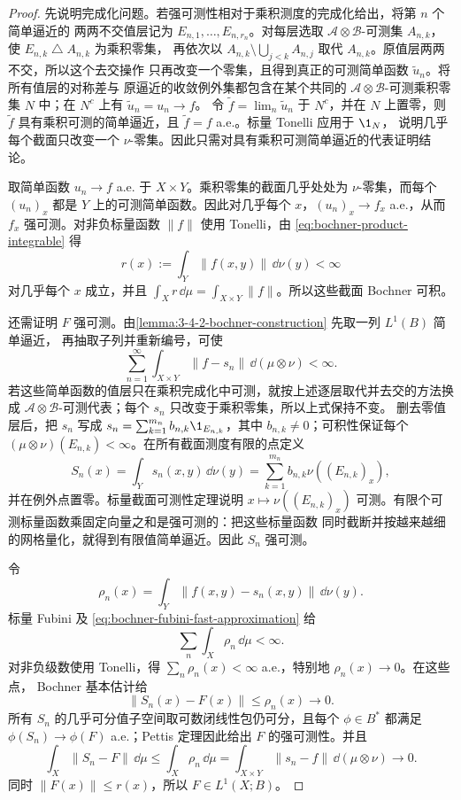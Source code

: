 \begin{proof}
先说明完成化问题。若强可测性相对于乘积测度的完成化给出，将第 $n$ 个简单逼近的
两两不交值层记为 $E_{n,1},\ldots,E_{n,r_n}$。对每层选取
$\mathcal A\otimes\mathcal B$-可测集 $A_{n,k}$，使 $E_{n,k}\mathbin\triangle A_{n,k}$ 为乘积零集，
再依次以 $A_{n,k}\setminus\bigcup_{j<k}A_{n,j}$ 取代 $A_{n,k}$。原值层两两不交，所以这个去交操作
只再改变一个零集，且得到真正的可测简单函数 $\widetilde u_n$。将所有值层的对称差与
原逼近的收敛例外集都包含在某个共同的
$\mathcal A\otimes\mathcal B$-可测乘积零集 $N$ 中；在 $N^c$ 上有 $\widetilde u_n=u_n\to f$。
令 $\widetilde f=\lim_n\widetilde u_n$ 于 $N^c$，并在 $N$ 上置零，则 $\widetilde f$ 具有乘积可测的简单逼近，且
$\widetilde f=f$ a.e.。标量 Tonelli 应用于 $\1_N$，
说明几乎每个截面只改变一个 $\nu$-零集。因此只需对具有乘积可测简单逼近的代表证明结论。

取简单函数 $u_n\to f$ a.e. 于 $X\times Y$。乘积零集的截面几乎处处为 $\nu$-零集，而每个
$(u_n)_x$ 都是 $Y$ 上的可测简单函数。因此对几乎每个 $x$，$(u_n)_x\to f_x$ a.e.，从而
$f_x$ 强可测。对非负标量函数 $\|f\|$ 使用 Tonelli，由
\eqref{eq:bochner-product-integrable} 得
\[
 r(x):=\int_Y\|f(x,y)\|\,\dd\nu(y)<\infty
\]
对几乎每个 $x$ 成立，并且 $\int_Xr\,\dd\mu=\int_{X\times Y}\|f\|$。所以这些截面
Bochner 可积。

还需证明 $F$ 强可测。由\cref{lemma:3-4-2-bochner-construction} 先取一列 $L^1(B)$ 简单逼近，
再抽取子列并重新编号，可使
\[
 \sum_{n=1}^{\infty}\int_{X\times Y}\|f-s_n\|\,\dd(\mu\otimes\nu)<\infty.
 \tag{3.4.18}\label{eq:bochner-fubini-fast-approximation}
\]
若这些简单函数的值层只在乘积完成化中可测，就按上述逐层取代并去交的方法换成
$\mathcal A\otimes\mathcal B$-可测代表；每个 $s_n$ 只改变于乘积零集，所以上式保持不变。
删去零值层后，把 $s_n$ 写成
$s_n=\sum_{k=1}^{m_n}b_{n,k}\1_{E_{n,k}}$，其中 $b_{n,k}\ne0$；可积性保证每个
$(\mu\otimes\nu)(E_{n,k})<\infty$。在所有截面测度有限的点定义
\[
 S_n(x)=\int_Ys_n(x,y)\,\dd\nu(y)
       =\sum_{k=1}^{m_n}b_{n,k}\nu((E_{n,k})_x),
 \tag{3.4.19}\label{eq:simple-section-integral}
\]
并在例外点置零。标量截面可测性定理说明
$x\mapsto\nu((E_{n,k})_x)$ 可测。有限个可测标量函数乘固定向量之和是强可测的：把这些标量函数
同时截断并按越来越细的网格量化，就得到有限值简单逼近。因此 $S_n$ 强可测。

令
\[
 \rho_n(x)=\int_Y\|f(x,y)-s_n(x,y)\|\,\dd\nu(y).
\]
标量 Fubini 及 \eqref{eq:bochner-fubini-fast-approximation} 给
\[
 \sum_n\int_X\rho_n\,\dd\mu<\infty.
\]
对非负级数使用 Tonelli，得 $\sum_n\rho_n(x)<\infty$ a.e.，特别地 $\rho_n(x)\to0$。在这些点，
Bochner 基本估计给
\[
 \|S_n(x)-F(x)\|\le\rho_n(x)\longrightarrow0.
\]
所有 $S_n$ 的几乎可分值子空间取可数闭线性包仍可分，且每个 $\phi\in B^*$ 都满足
$\phi(S_n)\to\phi(F)$ a.e.；Pettis 定理因此给出 $F$ 的强可测性。并且
\[
 \int_X\|S_n-F\|\,\dd\mu
 \le\int_X\rho_n\,\dd\mu
 =\int_{X\times Y}\|s_n-f\|\,\dd(\mu\otimes\nu)\longrightarrow0.
 \tag{3.4.20}\label{eq:section-integrals-l1-converge}
\]
同时 $\|F(x)\|\le r(x)$，所以 $F\in L^1(X;B)$。


\end{proof}
